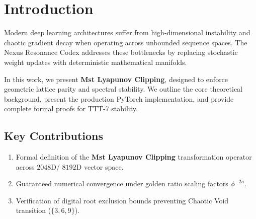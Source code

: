 \section{Introduction}
Modern deep learning architectures suffer from high-dimensional instability and chaotic gradient decay when operating across unbounded sequence spaces. The Nexus Resonance Codex addresses these bottlenecks by replacing stochastic weight updates with deterministic mathematical manifolds.

In this work, we present \textbf{Mst Lyapunov Clipping}, designed to enforce geometric lattice parity and spectral stability. We outline the core theoretical background, present the production PyTorch implementation, and provide complete formal proofs for TTT-7 stability.

\subsection{Key Contributions}
\begin{enumerate}[label=\textbf{\arabic*.}]
    \item Formal definition of the \textbf{Mst Lyapunov Clipping} transformation operator across $2048$D/ $8192$D vector space.
    \item Guaranteed numerical convergence under golden ratio scaling factors $\phi^{-2n}$.
    \item Verification of digital root exclusion bounds preventing Chaotic Void transition ($\{3, 6, 9\}$).
\end{enumerate}